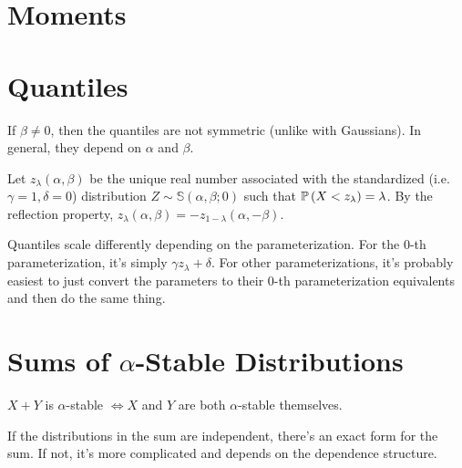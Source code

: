 \documentclass[twoside,10pt]{report}
\begin{document}
\section{Moments}


\section{Quantiles}

If $\beta \neq 0$, then the quantiles are not symmetric (unlike with Gaussians). In general, they depend on $\alpha$ and $\beta$.

Let $z_{\lambda}(\alpha,\beta)$ be the unique real number associated with the standardized (i.e. $\gamma=1, \delta=0$) distribution $Z \sim \mathbb{S}(\alpha,\beta;0)$ such that $\P{ X < z_{\lambda} }=\lambda$. By the reflection property, $z_{\lambda}(\alpha,\beta) = - z_{1-\lambda}(\alpha,-\beta)$.

Quantiles scale differently depending on the parameterization. For the 0-th parameterization, it's simply $\gamma z_{\lambda}+ \delta$. For other parameterizations, it's probably easiest to just convert the parameters to their 0-th parameterization equivalents and then do the same thing.

\section{Sums of \texorpdfstring{$\alpha$}{alpha}-Stable Distributions}

\begin{thrm}[]
$X + Y$ is $\alpha$-stable $\iff X$ and $Y$ are both $\alpha$-stable themselves.
\end{thrm}

If the distributions in the sum are independent, there's an exact form for the sum. If not, it's more complicated and depends on the dependence structure.
\end{document}
